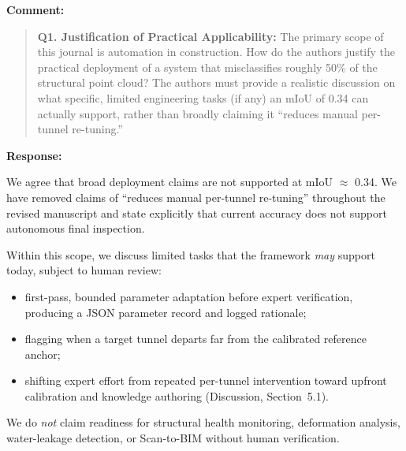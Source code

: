 \documentclass[11pt,a4paper]{article}
\newenvironment{commentblock}{%
  \par\smallskip\noindent\textbf{Comment:}\par
  \begin{quote}\itshape\color{black}
}{%
  \end{quote}\smallskip
}
\newenvironment{responseblock}{%
  \par\smallskip\noindent\textbf{Response:}\par
  \begingroup\color{responsegreen}
}{%
  \endgroup\smallskip
}
\begin{document}
\begin{commentblock}
\textbf{Q1. Justification of Practical Applicability:} The primary scope of this journal is automation in construction. How do the authors justify the practical deployment of a system that misclassifies roughly 50\% of the structural point cloud? The authors must provide a realistic discussion on what specific, limited engineering tasks (if any) an mIoU of 0.34 can actually support, rather than broadly claiming it ``reduces manual per-tunnel re-tuning.''
\end{commentblock}
\begin{responseblock}
We agree that broad deployment claims are not supported at mIoU $\approx$ 0.34. We have removed claims of ``reduces manual per-tunnel re-tuning'' throughout the revised manuscript and state explicitly that current accuracy does not support autonomous final inspection.

Within this scope, we discuss limited tasks that the framework \emph{may} support today, subject to human review:
\begin{itemize}[nosep]
  \item first-pass, bounded parameter adaptation before expert verification, producing a JSON parameter record and logged rationale;
  \item flagging when a target tunnel departs far from the calibrated reference anchor;
  \item shifting expert effort from repeated per-tunnel intervention toward upfront calibration and knowledge authoring (Discussion, Section~5.1).
\end{itemize}
We do \emph{not} claim readiness for structural health monitoring, deformation analysis, water-leakage detection, or Scan-to-BIM without human verification.
\end{responseblock}
\end{document}
